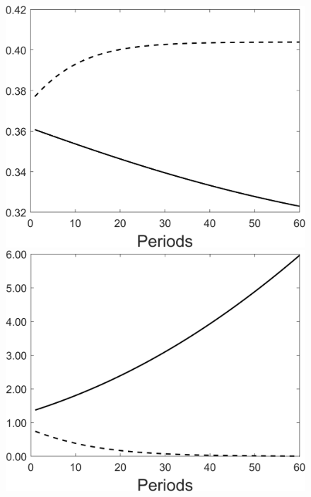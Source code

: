 \begin{figure}[h!!]
\begin{minipage}[]{0.32\textwidth}
	\end{minipage}
	\begin{minipage}[]{0.32\textwidth}
		\includegraphics[width=1\textwidth]{../codding_model/Own/figures/Rep_agent/staticRam_LF_separate_hl_periods59_eppsilon0.40_zeta1.40_Ad08_Ac04_thetac0.70_thetad0.56_HetGrowth1_tauul0.181_util0_withtarget0_lgd0.png}
	\end{minipage}
	\begin{minipage}[]{0.32\textwidth}
		\includegraphics[width=1\textwidth]{../codding_model/Own/figures/Rep_agent/staticRam_LF_separate_yc_periods59_eppsilon0.40_zeta1.40_Ad08_Ac04_thetac0.70_thetad0.56_HetGrowth1_tauul0.181_util0_withtarget0_lgd0.png}

\end{minipage}
\end{figure}
